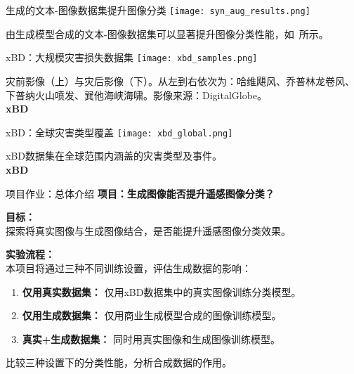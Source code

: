 \begin{refsection}
  \begin{frame}{生成的文本-图像数据集提升图像分类}
    \centering
    \texttt{[image: syn\_aug\_results.png]}
    
    \scriptsize
    由生成模型合成的文本-图像数据集可以显著提升图像分类性能，如~\parencite{heSYNTHETICDATAGENERATIVE2022}所示。
    \bottomleftrefs
  \end{frame}
\end{refsection}

\begin{refsection}
  \begin{frame}{xBD：大规模灾害损失数据集}
    \centering
    \texttt{[image: xbd\_samples.png]}
    
    \vspace{0.5em}
    \scriptsize
    灾前影像（上）与灾后影像（下）。从左到右依次为：哈维飓风、乔普林龙卷风、下普纳火山喷发、巽他海峡海啸。影像来源：DigitalGlobe。\\
    \textbf{xBD}~\parencite{guptaCreatingXBDDataset2019}
    \bottomleftrefs
  \end{frame}
\end{refsection}

\begin{refsection}
  \begin{frame}{xBD：全球灾害类型覆盖}
    \centering
    \texttt{[image: xbd\_global.png]}
    
    \vspace{0.5em}
    \scriptsize
    xBD数据集在全球范围内涵盖的灾害类型及事件。\\
    \textbf{xBD}~\parencite{guptaCreatingXBDDataset2019}
    \bottomleftrefs
  \end{frame}
\end{refsection}

\begin{refsection}
  \begin{frame}{项目作业：总体介绍}
    \textbf{项目：生成图像能否提升遥感图像分类？}
  
    \vspace{0.7em}
    \textbf{目标：}\\
    探索将真实图像与生成图像结合，是否能提升遥感图像分类效果。

    \vspace{1em}
    \textbf{实验流程：}\\
    本项目将通过三种不同训练设置，评估生成数据的影响：
    \begin{enumerate}
      \item \textbf{仅用真实数据集：} 仅用xBD数据集中的真实图像训练分类模型。
      \item \textbf{仅用生成数据集：} 仅用商业生成模型合成的图像训练模型。
      \item \textbf{真实+生成数据集：} 同时用真实图像和生成图像训练模型。
    \end{enumerate}
    比较三种设置下的分类性能，分析合成数据的作用。

    \bottomleftrefs
  \end{frame}
\end{refsection}
  
